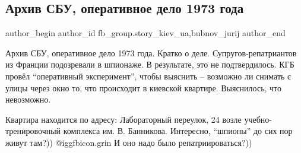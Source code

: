  
 
 
 
 
 
\subsection{Архив СБУ, оперативное дело 1973 года}
\label{sec:29_12_2021.fb.fb_group.story_kiev_ua.2.arhiv_sbu_1973}
 
\ifcmt
 author_begin
   author_id fb_group.story_kiev_ua,bubnov_jurij
 author_end
\fi

Архив СБУ, оперативное дело 1973 года. Кратко о деле. Супругов-репатриантов из
Франции подозревали в шпионаже. В результате, это не подтвердилось. КГБ провёл
\enquote{оперативный эксперимент}, чтобы выяснить – возможно ли снимать с улицы через
окно то, что происходит в киевской квартире. Выяснилось, что невозможно.


Квартира находится по адресу: Лабораторный переулок, 24 возле
учебно-тренировочный комплекса им. В. Банникова. Интересно, \enquote{шпионы} до сих пор
живут там?)) @igg{fbicon.grin}  И оно надо было репатриироваться?))

